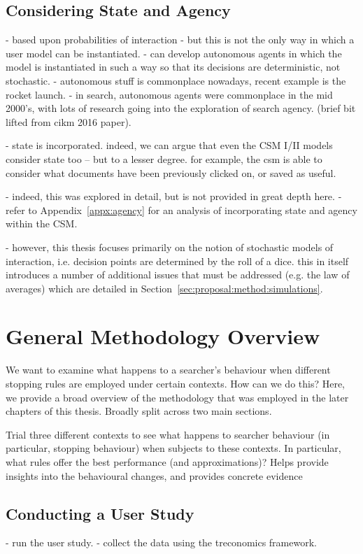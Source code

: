 \subsection{Considering State and Agency}
- based upon probabilities of interaction
- but this is not the only way in which a user model can be instantiated.
- can develop autonomous agents in which the model is instantiated in such a way so that its decisions are deterministic, not stochastic.
- autonomous stuff is commonplace nowadays, recent example is the rocket launch.
- in search, autonomous agents were commonplace in the mid 2000's, with lots of research going into the exploration of search agency. (brief bit lifted from cikm 2016 paper).

- state is incorporated. indeed, we can argue that even the CSM I/II models consider state too -- but to a lesser degree. for example, the csm is able to consider what documents have been previously clicked on, or saved as useful.

- indeed, this was explored in detail, but is not provided in great depth here.
- refer to Appendix~\ref{appx:agency} for an analysis of incorporating state and agency within the CSM.

- however, this thesis focuses primarily on the notion of stochastic models of interaction, i.e. decision points are determined by the roll of a dice. this in itself introduces a number of additional issues that must be addressed (e.g. the law of averages) which are detailed in Section~\ref{sec:proposal:method:simulations}.

\section{General Methodology Overview}\label{sec:proposal:method}

We want to examine what happens to a searcher's behaviour when different stopping rules are employed under certain contexts.
How can we do this? Here, we provide a broad overview of the methodology that was employed in the later chapters of this thesis. Broadly split across two main sections.

Trial three different contexts to see what happens to searcher behaviour (in particular, stopping behaviour) when subjects to these contexts. In particular, what rules offer the best performance (and approximations)? Helps provide insights into the behavioural changes, and provides concrete evidence 

\subsection{Conducting a User Study}
- run the user study.
- collect the data using the treconomics framework.

